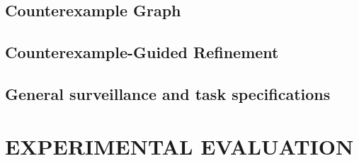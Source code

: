 \documentclass[letterpaper, 10 pt, conference]{ieeeconf}  %
\begin{document}
\subsection{Counterexample Graph}

\subsection{Counterexample-Guided Refinement}

\subsection{General surveillance and task specifications}



\section{EXPERIMENTAL EVALUATION}\label{sec:experiments}



%








\end{document}

